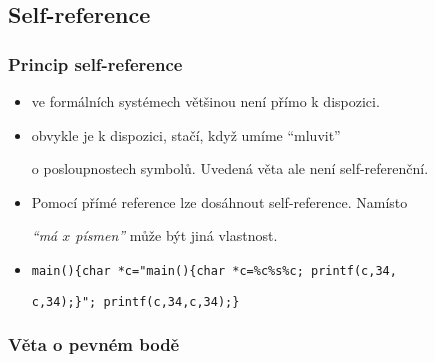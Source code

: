     
    
    \subsection*{Self-reference}
    \subsubsection*{Princip self-reference}
    
    \begin{itemize}
    \item {}
    \medskip
    
     ve formálních systémech většinou není přímo k dispozici.
    \medskip
    
    \item {}
    \medskip
    
     obvykle je k dispozici, stačí, když umíme ``mluvit''
    \smallskip
    
    o posloupnostech symbolů. Uvedená věta ale není self-referenční.
    \medskip
    
    \item {}
    \smallskip
    
    \smallskip
    
    \medskip
    
    Pomocí přímé reference lze dosáhnout self-reference. Namísto
    \smallskip
    
    \emph{``má $x$ písmen''} může být jiná vlastnost.
    \medskip
    
    \item \texttt{main()\{char *c="main()\{char *c=\%c\%s\%c; printf(c,34,}
    \smallskip
    
    \texttt{c,34);\}"; printf(c,34,c,34);\}}
    \end{itemize}
    
    
    
    
    \subsubsection*{Věta o pevném bodě}
    
